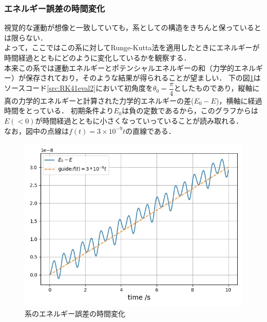 \documentclass[a4paper,11pt]{jsarticle}
\begin{document}
\subsubsection{エネルギー誤差の時間変化}
視覚的な運動が想像と一致していても，系としての構造をきちんと保っているとは限らない．\\
よって，ここではこの系に対してRunge-Kutta法を適用したときにエネルギーが時間経過とともにどのように変化しているかを観察する．\\
本来この系では運動エネルギーとポテンシャルエネルギーの和（力学的エネルギー）が保存されており，そのような結果が得られることが望ましい．
下の図\ref{fig:RK41_eval2}はソースコード\ref{src:RK41eval2}において初角度を\(\theta_0 = \dfrac{\pi}{4}\)としたものであり，縦軸に真の力学的エネルギーと計算された力学的エネルギーの差(\(E_0 - E\))，横軸に経過時間をとっている．
初期条件より\(E_0\)は負の定数であるから，このグラフからは\(E (< 0)\)が時間経過とともに小さくなっていっていることが読み取れる．\\
なお，図中の点線は\(f(t) = 3\times10^{-9}t\)の直線である．
\begin{figure}[H]
  \begin{center}
    \includegraphics[scale=0.6]{figure/RK41/evaluation2/2021-2-9-223945.jpeg}
    \caption{系のエネルギー誤差の時間変化}
    \label{fig:RK41_eval2}
  \end{center}
\end{figure}
\newpage
\end{document}
